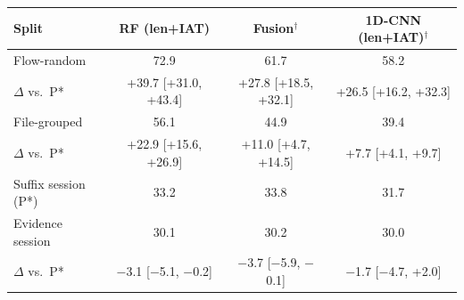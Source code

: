 \begin{tabular}{lccc}
\toprule
Split & RF (len+IAT) & Fusion$^\dagger$ & 1D-CNN (len+IAT)$^\dagger$ \\
\midrule
Flow-random & 72.9 & 61.7 & 58.2 \\
\quad $\Delta$ vs.\ P* & +39.7 [+31.0, +43.4] & +27.8 [+18.5, +32.1] & +26.5 [+16.2, +32.3] \\
File-grouped & 56.1 & 44.9 & 39.4 \\
\quad $\Delta$ vs.\ P* & +22.9 [+15.6, +26.9] & +11.0 [+4.7, +14.5] & +7.7 [+4.1, +9.7] \\
Suffix session (P*) & 33.2 & 33.8 & 31.7 \\
Evidence session & 30.1 & 30.2 & 30.0 \\
\quad $\Delta$ vs.\ P* & $-$3.1 [$-$5.1, $-$0.2] & $-$3.7 [$-$5.9, $-$0.1] & $-$1.7 [$-$4.7, +2.0] \\
\bottomrule
\end{tabular}

